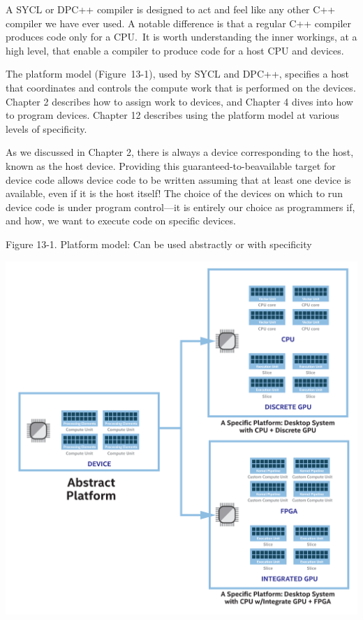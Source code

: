 A SYCL or DPC++ compiler is designed to act and feel like any other C++ compiler we have ever used. A notable difference is that a regular C++ compiler produces code only for a CPU. It is worth understanding the inner workings, at a high level, that enable a compiler to produce code for a host CPU and devices.\par

The platform model (Figure 13-1), used by SYCL and DPC++, specifies a host that coordinates and controls the compute work that is performed on the devices. Chapter 2 describes how to assign work to devices, and Chapter 4 dives into how to program devices. Chapter 12 describes using the platform model at various levels of specificity.\par

As we discussed in Chapter 2, there is always a device corresponding to the host, known as the host device. Providing this guaranteed-to-beavailable target for device code allows device code to be written assuming that at least one device is available, even if it is the host itself! The choice of the devices on which to run device code is under program control—it is entirely our choice as programmers if, and how, we want to execute code on specific devices.\par

\hspace*{\fill} \par %
Figure 13-1. Platform model: Can be used abstractly or with specificity
\begin{center}
	\includegraphics[width=1.\textwidth]{content/chapter-13/images/2}
\end{center}


